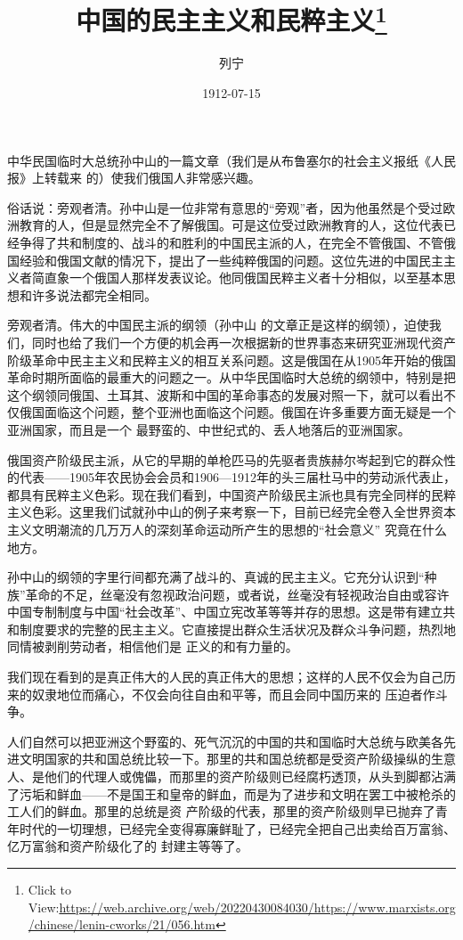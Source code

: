 \documentclass{article}
\title{中国的民主主义和民粹主义\footnote{Click to View:\url{https://web.archive.org/web/20220430084030/https://www.marxists.org/chinese/lenin-cworks/21/056.htm}}}
\author{列宁}
\date{1912-07-15}
\begin{document}

\maketitle


\Large

﻿中华民国临时大总统孙中山的一篇文章（我们是从布鲁塞尔的社会主义报纸《人民报》上转载来
的）使我们俄国人非常感兴趣。 

俗话说：旁观者清。孙中山是一位非常有意思的“旁观”者，因为他虽然是个受过欧洲教育的人，但是显然完全不了解俄国。可是这位受过欧洲教育的人，这位代表已经争得了共和制度的、战斗的和胜利的中国民主派的人，在完全不管俄国、不管俄国经验和俄国文献的情况下，提出了一些纯粹俄国的问题。这位先进的中国民主主义者简直象一个俄国人那样发表议论。他同俄国民粹主义者十分相似，以至基本思
想和许多说法都完全相同。 

旁观者清。伟大的中国民主派的纲领（孙中山
\newpage
的文章正是这样的纲领），迫使我们，同时也给了我们一个方便的机会再一次根据新的世界事态来研究亚洲现代资产阶级革命中民主主义和民粹主义的相互关系问题。这是俄国在从1905年开始的俄国革命时期所面临的最重大的问题之一。从中华民国临时大总统的纲领中，特别是把这个纲领同俄国、土耳其、波斯和中国的革命事态的发展对照一下，就可以看出不仅俄国面临这个问题，整个亚洲也面临这个问题。俄国在许多重要方面无疑是一个亚洲国家，而且是一个
最野蛮的、中世纪式的、丢人地落后的亚洲国家。 

俄国资产阶级民主派，从它的早期的单枪匹马的先驱者贵族赫尔岑起到它的群众性的代表——1905年农民协会会员和1906—1912年的头三届杜马中的劳动派代表止，都具有民粹主义色彩。现在我们看到，中国资产阶级民主派也具有完全同样的民粹主义色彩。这里我们试就孙中山的例子来考察一下，目前已经完全卷入全世界资本主义文明潮流的几万万人的深刻革命运动所产生的思想的“社会意义”
究竟在什么地方。 

\newpage

孙中山的纲领的字里行间都充满了战斗的、真诚的民主主义。它充分认识到“种族”革命的不足，丝毫没有忽视政治问题，或者说，丝毫没有轻视政治自由或容许中国专制制度与中国“社会改革”、中国立宪改革等等并存的思想。这是带有建立共和制度要求的完整的民主主义。它直接提出群众生活状况及群众斗争问题，热烈地同情被剥削劳动者，相信他们是
正义的和有力量的。 

我们现在看到的是真正伟大的人民的真正伟大的思想；这样的人民不仅会为自己历来的奴隶地位而痛心，不仅会向往自由和平等，而且会同中国历来的
压迫者作斗争。 

人们自然可以把亚洲这个野蛮的、死气沉沉的中国的共和国临时大总统与欧美各先进文明国家的共和国总统比较一下。那里的共和国总统都是受资产阶级操纵的生意人、是他们的代理人或傀儡，而那里的资产阶级则已经腐朽透顶，从头到脚都沾满了污垢和鲜血——不是国王和皇帝的鲜血，而是为了进步和文明在罢工中被枪杀的工人们的鲜血。那里的总统是资
\newpage
产阶级的代表，那里的资产阶级则早已抛弃了青年时代的一切理想，已经完全变得寡廉鲜耻了，已经完全把自己出卖给百万富翁、亿万富翁和资产阶级化了的
封建主等等了。 
\end{document}
